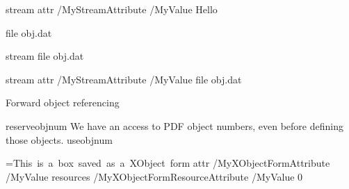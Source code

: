 \pdfobj stream              %
    attr {/MyStreamAttribute /MyValue} %
    {Hello}
\pdfrefobj \pdflastobj

\pdfobj file {obj.dat}      %
\pdfrefobj \pdflastobj

\pdfobj stream              %
    file {obj.dat}
\pdfrefobj \pdflastobj

\pdfobj stream              %
    attr {/MyStreamAttribute /MyValue} %
    file {obj.dat}
\pdfrefobj \pdflastobj


 {Forward object referencing}

\pdfobj reserveobjnum
We have an access to PDF object numbers, even before defining those objects.
\pdfobj useobjnum
\pdfrefobj\pdflastobj

\endfeature


=\hbox{This is a box saved as a XObject form}
\pdfxform
   attr      {/MyXObjectFormAttribute         /MyValue}
   resources {/MyXObjectFormResourceAttribute /MyValue}
   0


